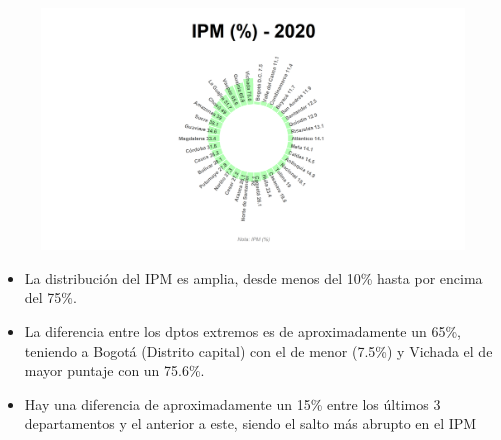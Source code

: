     \begin{figure}[H]
        \caption[Índice de Pobreza Multidimensional por departamentos para el 2020 ]{\label{ipm_dptos} }
        \begin{center}
        \includegraphics[width=\textwidth,keepaspectratio]{img/var_268_static.png}
        \end{center}
    \end{figure}
            \begin{itemize}
                    \item La distribución del IPM es amplia, desde menos del 10\% hasta por encima del 75\%.
                    \item La diferencia entre los dptos extremos es de aproximadamente un 65\%, teniendo a Bogotá (Distrito capital) con el de menor (7.5\%) y Vichada el de mayor puntaje con un 75.6\%.  
                    \item Hay una diferencia de aproximadamente un 15\% entre los últimos 3 departamentos y el anterior a este, siendo el salto más abrupto en el IPM
                    \end{itemize}

